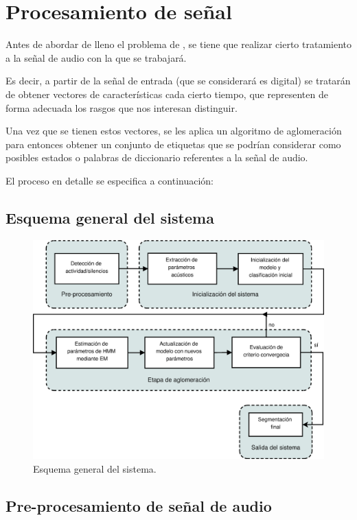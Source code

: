 \section{Procesamiento de señal}

Antes de abordar de lleno el problema de \sd, se tiene que realizar cierto tratamiento a la señal de audio con la que se trabajará. 

Es decir, a partir de la señal de entrada (que se considerará es digital) se tratarán de obtener vectores de características cada cierto tiempo, que representen de forma adecuada los rasgos que nos interesan distinguir.

Una vez que se tienen estos vectores, se les aplica un algoritmo de aglomeración para entonces obtener un conjunto de etiquetas que se podrían considerar como posibles estados o palabras de diccionario referentes a la señal de audio.

El proceso en detalle se especifica a continuación: 
\subsection{Esquema general del sistema}

\begin{figure}[bth]
  \centerline
  {\includegraphics[width=1.4\linewidth]{gfx/chap2/ASR_flow}} \quad
  \caption{Esquema general del sistema.}
  \label{fig:esquema}
\end{figure}

\subsection{Pre-procesamiento de señal de audio}

